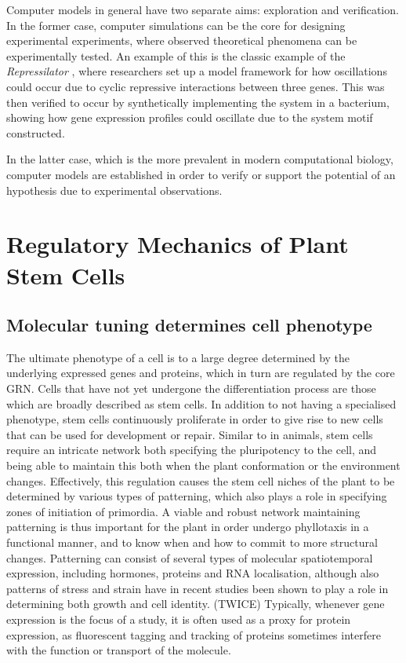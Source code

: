 Computer models in general have two separate aims: exploration and verification.
In the former case, computer simulations can be the core for designing
experimental experiments, where observed theoretical phenomena can be
experimentally tested. An example of this is the classic example of the
\textit{Repressilator} \CITE, where researchers set up a model framework for how
oscillations could occur due to cyclic repressive interactions between three
genes. This was then verified to occur by synthetically implementing the system
in a bacterium, showing how gene expression profiles could oscillate due to the
system motif constructed. 

In the latter case, which is the more prevalent in modern computational biology,
computer models are established in order to verify or support the potential of
an hypothesis due to experimental observations. \CITE 
\REWRITE

\section{Regulatory Mechanics of Plant Stem Cells} %
\subsection{Molecular tuning determines cell phenotype} %
The ultimate phenotype of a cell is to a large degree determined by the underlying
expressed genes and proteins, which in turn are regulated by the core GRN. Cells
that have not yet undergone the differentiation process are those which are
broadly described as stem cells. In addition to not having a specialised phenotype,
stem cells continuously proliferate in order to give rise to new cells that can
be used for development or repair. \CITE
Similar to in animals, stem cells require an intricate network both specifying
the pluripotency to the cell, and being able to maintain this both when the plant
conformation or the environment changes. Effectively, this regulation causes the
stem cell niches of the plant to be determined by various types of patterning,
which also plays a role in specifying zones of initiation of primordia.
A viable and robust network maintaining patterning is thus important for 
the plant in order undergo phyllotaxis in a functional manner, and to know when
and how to commit to more structural changes. Patterning can consist of several
types of molecular spatiotemporal expression, including hormones, proteins and
RNA localisation, although also patterns of stress and strain have in recent
studies been shown to play a role in determining both growth and cell identity.
\CITE (TWICE) Typically, whenever gene expression is the focus of a study, it
is often used as a proxy for protein expression, as fluorescent tagging
and tracking of proteins sometimes interfere with the function or transport of
the molecule. 

